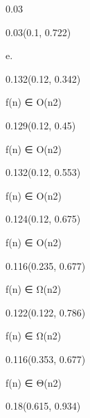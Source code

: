 \documentclass[aspectratio=169]{beamer}
\begin{document}
\begin{frame}[fragile]
\begin{textblock}{0.03}
\end{textblock}
\begin{textblock}{0.03}(0.1, 0.722)
  \begin{minipage}[t][0.054\paperheight]{\linewidth}
    {\tiny e.}
  \end{minipage}
\end{textblock}
\begin{textblock}{0.132}(0.12, 0.342)
  \begin{minipage}[t][0.054\paperheight]{\linewidth}
    {\tiny f(n) ∈ O(n2)}
  \end{minipage}
\end{textblock}
\begin{textblock}{0.129}(0.12, 0.45)
  \begin{minipage}[t][0.054\paperheight]{\linewidth}
    {\tiny f(n) ∈ O(n2)}
  \end{minipage}
\end{textblock}
\begin{textblock}{0.132}(0.12, 0.553)
  \begin{minipage}[t][0.054\paperheight]{\linewidth}
    {\tiny f(n) ∈ O(n2)}
  \end{minipage}
\end{textblock}
\begin{textblock}{0.124}(0.12, 0.675)
  \begin{minipage}[t][0.054\paperheight]{\linewidth}
    {\tiny f(n) ∈ O(n2)}
  \end{minipage}
\end{textblock}
\begin{textblock}{0.116}(0.235, 0.677)
  \begin{minipage}[t][0.054\paperheight]{\linewidth}
    {\tiny f(n) ∈ Ω(n2)}
  \end{minipage}
\end{textblock}
\begin{textblock}{0.122}(0.122, 0.786)
  \begin{minipage}[t][0.054\paperheight]{\linewidth}
    {\tiny f(n) ∈ Ω(n2)}
  \end{minipage}
\end{textblock}
\begin{textblock}{0.116}(0.353, 0.677)
  \begin{minipage}[t][0.054\paperheight]{\linewidth}
    {\tiny f(n) ∈ Θ(n2)}
  \end{minipage}
\end{textblock}
\begin{textblock}{0.18}(0.615, 0.934)
  \begin{minipage}[b][0.032\paperheight]{\linewidth}

\end{minipage}
\end{textblock}
\end{frame}
\end{document}
